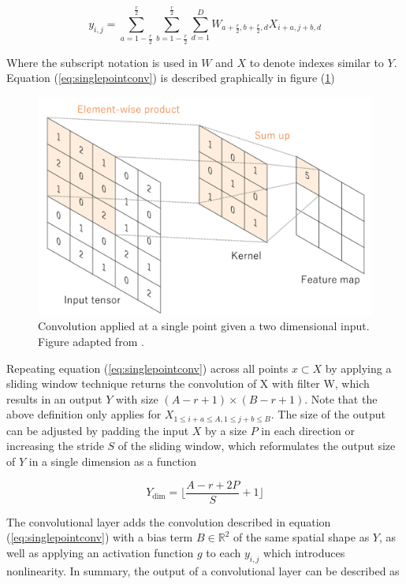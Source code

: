 \documentclass[../main/thesis.tex]{subfiles}
\begin{document}
\begin{equation}
    \label{eq:singlepointconv}
    y_{i,j} = \sum_{a=1-\frac{r}{2}}^\frac{r}{2} \sum_{b=1-\frac{r}{2}}^\frac{r}{2} \sum_{d=1}^D W_{a + \frac{r}{2},b + \frac{r}{2}, d} X_{i+a,j+b,d}
\end{equation}

Where the subscript notation is used in $W$ and $X$ to denote indexes similar to $Y$. Equation (\ref{eq:singlepointconv}) is described graphically in figure (\ref{fig:convlayer})

\begin{figure}
    \centering
    \includegraphics[width=.6\textwidth]{convlayer}
    \caption{\label{fig:convlayer}Convolution applied at a single point given a two dimensional input. Figure adapted from \protect\citep{Yamashita2018}.}
\end{figure}

Repeating equation (\ref{eq:singlepointconv}) across all points $x \subset X$ by applying a sliding window technique returns the convolution of X with filter W, which results in an output $Y$ with size $(A-r+1) \times (B-r+1)$. Note that the above definition only applies for $X_{1 \leq i+a \leq A, 1 \leq j+b \leq B}$. The size of the output can be adjusted by padding the input $X$ by a size $P$ in each direction or increasing the stride $S$ of the sliding window, which reformulates the output size of $Y$ in a single dimension as a function

\begin{equation}
    \label{eq:outputdim}
    Y_\text{dim} = \lfloor\frac{A - r + 2P}{S} + 1\rfloor    
\end{equation}

The convolutional layer adds the convolution described in equation (\ref{eq:singlepointconv}) with a bias term $B \in{\mathbb{R}^2}$ of the same spatial shape as $Y$, as well as applying an activation function $g$ to each $y_{i,j}$ which introduces nonlinearity. In summary, the output of a convolutional layer can be described as 
\end{document}
